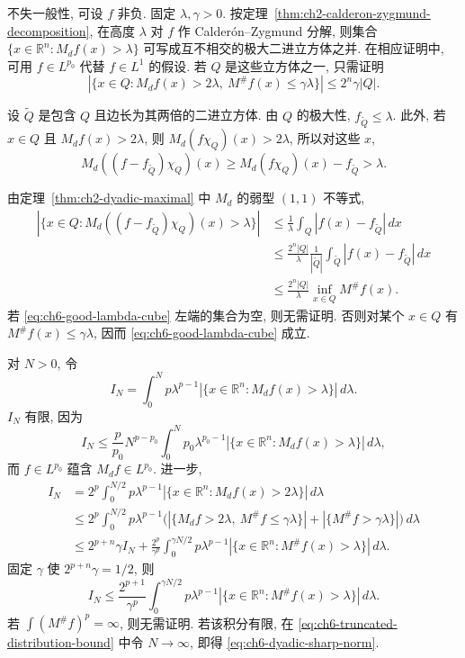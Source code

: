 \begin{Proof}
不失一般性, 可设 $f$ 非负. 固定 $\lambda,\gamma>0$. 按定理~\ref{thm:ch2-calderon-zygmund-decomposition}, 在高度 $\lambda$ 对 $f$ 作 Calderón--Zygmund 分解, 则集合 $\{x\in\mathbb R^n:M_df(x)>\lambda\}$ 可写成互不相交的极大二进立方体之并. 在相应证明中, 可用 $f\in L^{p_0}$ 代替 $f\in L^1$ 的假设. 若 $Q$ 是这些立方体之一, 只需证明
\begin{equation}
\label{eq:ch6-good-lambda-cube}
 |\{x\in Q:M_df(x)>2\lambda,\ M^\#f(x)\le\gamma\lambda\}|
 \le2^n\gamma|Q|.
\end{equation}

设 $\widetilde Q$ 是包含 $Q$ 且边长为其两倍的二进立方体. 由 $Q$ 的极大性, $f_{\widetilde Q}\le\lambda$. 此外, 若 $x\in Q$ 且 $M_df(x)>2\lambda$, 则 $M_d(f\chi_Q)(x)>2\lambda$, 所以对这些 $x$,
\[
 M_d((f-f_{\widetilde Q})\chi_Q)(x)
 \ge M_d(f\chi_Q)(x)-f_{\widetilde Q}>\lambda.
\]

\hypertarget{chapter-06-page-134}{}
由定理~\ref{thm:ch2-dyadic-maximal} 中 $M_d$ 的弱型 $(1,1)$ 不等式,
\[
\begin{aligned}
 |\{x\in Q:M_d((f-f_{\widetilde Q})\chi_Q)(x)>\lambda\}|
 &\le\frac1\lambda\int_Q|f(x)-f_{\widetilde Q}|\,dx\\
 &\le\frac{2^n|Q|}{\lambda}\frac1{|\widetilde Q|}
 \int_{\widetilde Q}|f(x)-f_{\widetilde Q}|\,dx\\
 &\le\frac{2^n|Q|}{\lambda}\inf_{x\in Q}M^\#f(x).
\end{aligned}
\]
若 \eqref{eq:ch6-good-lambda-cube} 左端的集合为空, 则无需证明. 否则对某个 $x\in Q$ 有 $M^\#f(x)\le\gamma\lambda$, 因而 \eqref{eq:ch6-good-lambda-cube} 成立.
\end{Proof}

\begin{Proof}
对 $N>0$, 令
\[
 I_N=\int_0^Np\lambda^{p-1}
 |\{x\in\mathbb R^n:M_df(x)>\lambda\}|\,d\lambda.
\]
$I_N$ 有限, 因为
\[
 I_N\le\frac p{p_0}N^{p-p_0}
 \int_0^Np_0\lambda^{p_0-1}
 |\{x\in\mathbb R^n:M_df(x)>\lambda\}|\,d\lambda,
\]
而 $f\in L^{p_0}$ 蕴含 $M_df\in L^{p_0}$. 进一步,
\[
\begin{aligned}
 I_N
 &=2^p\int_0^{N/2}p\lambda^{p-1}
 |\{x\in\mathbb R^n:M_df(x)>2\lambda\}|\,d\lambda\\
 &\le2^p\int_0^{N/2}p\lambda^{p-1}
 \bigl(|\{M_df>2\lambda,\ M^\#f\le\gamma\lambda\}|
 +|\{M^\#f>\gamma\lambda\}|\bigr)\,d\lambda\\
 &\le2^{p+n}\gamma I_N
 +\frac{2^p}{\gamma^p}\int_0^{\gamma N/2}p\lambda^{p-1}
 |\{x\in\mathbb R^n:M^\#f(x)>\lambda\}|\,d\lambda.
\end{aligned}
\]
固定 $\gamma$ 使 $2^{p+n}\gamma=1/2$, 则
\begin{equation}
\label{eq:ch6-truncated-distribution-bound}
 I_N\le\frac{2^{p+1}}{\gamma^p}\int_0^{\gamma N/2}p\lambda^{p-1}
 |\{x\in\mathbb R^n:M^\#f(x)>\lambda\}|\,d\lambda.
\end{equation}
若 $\int(M^\#f)^p=\infty$, 则无需证明. 若该积分有限, 在 \eqref{eq:ch6-truncated-distribution-bound} 中令 $N\to\infty$, 即得 \eqref{eq:ch6-dyadic-sharp-norm}.
\end{Proof}

